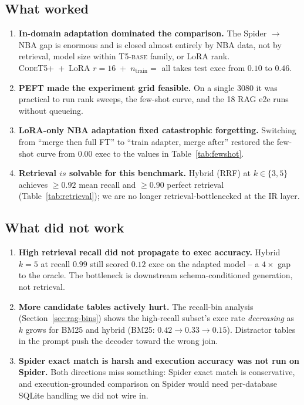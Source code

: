 \documentclass[11pt,a4paper]{article}
\newcommand{\codet}{\textsc{CodeT5+}}
\newcommand{\tfive}{\textsc{T5-base}}
\begin{document}
\subsection{What worked}
\begin{enumerate}[leftmargin=*,itemsep=2pt]
\item \textbf{In-domain adaptation dominated the comparison.} The
      Spider $\to$ NBA gap is enormous and is closed almost entirely by NBA
      data, not by retrieval, model size within \tfive{} family, or LoRA rank.
      \codet{}~+~LoRA $r{=}16$~+~$n_{\text{train}}{=}$ all takes test exec
      from $0.10$ to $0.46$.
\item \textbf{PEFT made the experiment grid feasible.} On a single 3080 it was
      practical to run rank sweeps, the few-shot curve, and the 18 RAG e2e
      runs without queueing.
\item \textbf{LoRA-only NBA adaptation fixed catastrophic forgetting.}
      Switching from ``merge then full FT'' to ``train adapter, merge after''
      restored the few-shot curve from $0.00$ exec to the values in
      Table~\ref{tab:fewshot}.
\item \textbf{Retrieval $is$ solvable for this benchmark.} Hybrid (RRF) at
      $k\in\{3,5\}$ achieves $\geq 0.92$ mean recall and $\geq 0.90$ perfect
      retrieval (Table~\ref{tab:retrieval}); we are no longer
      retrieval-bottlenecked at the IR layer.
\end{enumerate}

\subsection{What did not work}
\begin{enumerate}[leftmargin=*,itemsep=2pt]
\item \textbf{High retrieval recall did not propagate to exec accuracy.}
      Hybrid $k{=}5$ at recall $0.99$ still scored $0.12$ exec on the adapted
      model -- a $4{\times}$ gap to the oracle. The bottleneck is downstream
      schema-conditioned generation, not retrieval.
\item \textbf{More candidate tables actively hurt.} The recall-bin analysis
      (Section~\ref{sec:rag-bins}) shows the high-recall subset's exec rate
      \emph{decreasing} as $k$ grows for BM25 and hybrid (BM25:
      $0.42 \to 0.33 \to 0.15$). Distractor tables in the prompt push the
      decoder toward the wrong join.
\item \textbf{Spider exact match is harsh and execution accuracy was not run
      on Spider.} Both directions miss something: Spider exact match is
      conservative, and execution-grounded comparison on Spider would need
      per-database SQLite handling we did not wire in.
\end{enumerate}
\end{document}
